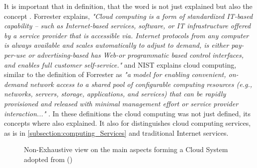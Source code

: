 It is important that in definition, that the word is not just explained but also the concept \cite{defineConcept}. Forrester explains, \textit{"Cloud computing is a form of standardized IT-based capability – such as Internet-based services, software, or IT infrastructure offered by a service provider that is accessible via. Internet protocols from any computer is always available and scales automatically to adjust to demand, is either pay-per-use or advertising-based has Web-or programmatic based control interfaces, and enables full customer self-service."} and NIST explains cloud computing, similar to the definition of Forrester as \textit{"a model for enabling convenient, on-demand network access to a shared pool of configurable computing resources (e.g., networks, servers, storage, applications, and services) that can be rapidly provisioned and released with minimal management effort or service provider interaction..."} \cite{mell2011nist}. In these definitions the cloud computing was not just defined, its concepts where also explained. It also for distinguishes cloud computing services, as is in \ref{subsection:computing_Services} and traditional Internet services.
\begin{figure}[h]
\centering
{}
  \caption{Non-Exhaustive view on the main aspects forming a Cloud System adopted from \citeauthor{thiel2015cloud} (\citeyear{thiel2015cloud}) \cite{thiel2015cloud}}
  \label{fig: cloud_Systems}
\end{figure}


